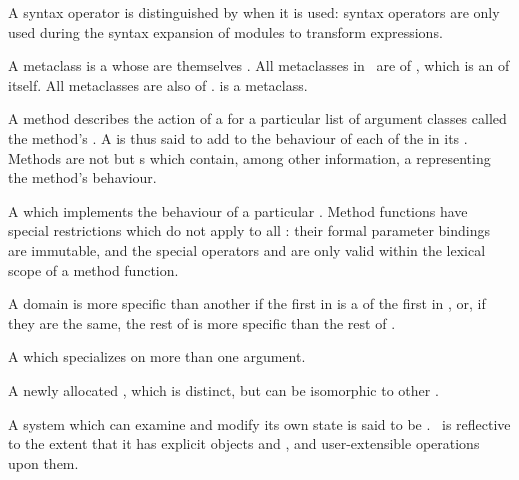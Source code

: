 \begin{optDefinition}
\begin{definitions}
     A syntax
    operator is distinguished by when it is used: syntax operators are only used
    during the syntax expansion of modules to transform expressions.

      A metaclass is a
      whose  are themselves .
    All metaclasses in \eulisp\ are  of , which is
    an  of itself.  All metaclasses are also  of
    .   is a metaclass.

      A method describes the action of
    a  for a particular list of argument classes
    called the method's .  A  is thus said to add to the
    behaviour of each of the  in its .  Methods are not
     but s which contain, among other information, a
     representing the method's behaviour.

      A
     which implements the behaviour of a particular .
    Method functions have special restrictions which do not apply to all
    : their formal parameter bindings are immutable, and the
    special operators  and 
    are only valid within the lexical scope of a method function.

     
     A domain  is more
    specific than another  if the first  in
     is a  of the first  in
    , or, if they are the same, the rest of  is
    more specific than the rest of .

      A  which
    specializes on more than one argument.

     A newly allocated
    , which is distinct, but can be isomorphic to other
    .

      A system which can
    examine and modify its own state is said to be .  \eulisp\
    is reflective to the extent that it has explicit  objects and
    \sc{metaclasses}, and user-extensible operations upon them.


\end{definitions}
\end{optDefinition}
